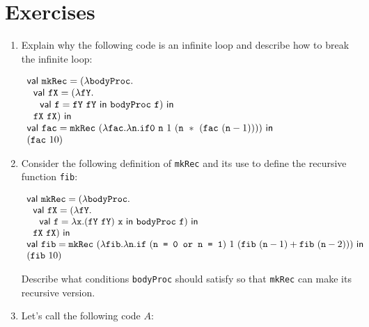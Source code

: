 \section{Exercises}

\begin{enumerate}
\item Explain why the following code is an infinite loop and describe how to break the infinite loop:

$\begin{array}{l}
    \ebind{\code{mkRec}}{(\efun{\code{bodyProc}}{
        \\ \ \ \ebind{\code{fX}}{(\efun{\code{fY}}{
            \\ \ \ \ \ \ebind{\code{f}}{\eapp{\code{fY}}{\code{fY}}}{\eapp{\code{bodyProc}}{\code{f}}}}) }{\\ \ \ \eapp{\code{fX}}{\code{fX}}}}) }{
                \\ \ebind{\code{fac}}{\eapp{\code{mkRec}}{(\efun{\code{fac}}{\efun{\code{n}}{\code{if0}\ \code{n}\ 1\ (\code{n}\ *\ (\eapp{\code{fac}}{(\esub{\code{n}}{1})}) )}})}}{
        \\ ( \eapp{\code{fac}}{10} )
    }
}
\end{array}$

\item Consider the following definition of \texttt{mkRec} and its use to define the recursive
function \texttt{fib}:

$\begin{array}{l}
    \ebind{\code{mkRec}}{(\efun{\code{bodyProc}}{
        \\ \ \ \ebind{\code{fX}}{(\efun{\code{fY}}{
            \\ \ \ \ \ \ebind{\code{f}}{ \efun{\cx}{\eapp{(\eapp{\code{fY}}{\code{fY}})}{\cx}} }{\eapp{\code{bodyProc}}{\code{f}}}}) }{\\ \ \ \eapp{\code{fX}}{\code{fX}}}}) }{
                \\ \ebind{\code{fib}}{\eapp{\code{mkRec}}{(\efun{\code{fib}}{\efun{\code{n}}{\code{if}\ (\code{n = 0 or n = 1})\ 1\ (\eadd{\eapp{\code{fib}}{(\esub{\code{n}}{1})}}{\eapp{\code{fib}}{(\esub{\code{n}}{2})}} )}})}}{
        \\ ( \eapp{\code{fib}}{10} )
    }
}
\end{array}$

Describe what conditions \texttt{bodyProc} should satisfy so that \texttt{mkRec} can make its recursive version.

\item Let's call the following code $A$:


\end{enumerate}
